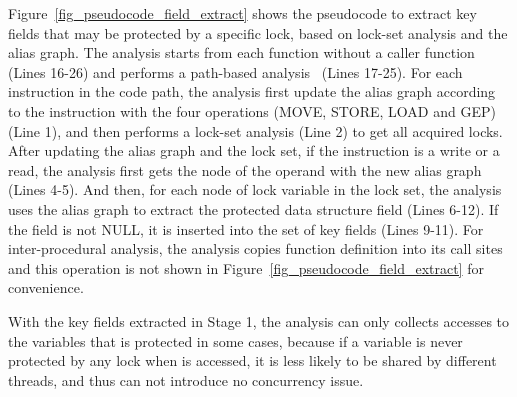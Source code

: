 Figure~\ref{fig_pseudocode_field_extract} shows the pseudocode to extract key 
fields that may be protected by a specific lock, based on lock-set analysis and 
the alias graph. The analysis starts from each function without a caller 
function (Lines 16-26) and performs a path-based analysis~\cite{Li:ASPLOS22} 
(Lines 17-25). For each instruction in the code path, the analysis first update 
the alias graph according to the instruction with the four operations (MOVE, 
STORE, LOAD and GEP) (Line 1), and then performs a lock-set analysis (Line 2) 
to get all acquired locks. After updating the alias graph and the lock set, if 
the instruction is a write or a read, the analysis first gets the node of the 
operand with the new alias graph (Lines 4-5). And then, for each node of 
lock variable in the lock set, the analysis uses the alias graph to extract the 
protected data structure field (Lines 6-12). If the field is not NULL, it is 
inserted into the set of key fields (Lines 9-11). For inter-procedural 
analysis, the analysis copies function definition into its call sites and this 
operation is not shown in Figure~\ref{fig_pseudocode_field_extract} for 
convenience. 

 With the key fields extracted in Stage 1, the 
analysis can only collects accesses to the variables that is protected in some 
cases, because if a variable is never protected by any lock when is accessed, 
it is less likely to be shared by different threads, and thus can not introduce 
no concurrency issue.


